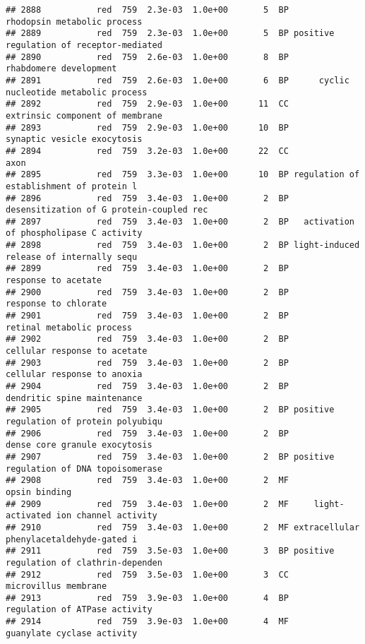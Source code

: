 \documentclass[]{article}
\begin{document}
\begin{verbatim}
## 2888           red  759  2.3e-03  1.0e+00       5  BP              rhodopsin metabolic process
## 2889           red  759  2.3e-03  1.0e+00       5  BP positive regulation of receptor-mediated
## 2890           red  759  2.6e-03  1.0e+00       8  BP                   rhabdomere development
## 2891           red  759  2.6e-03  1.0e+00       6  BP      cyclic nucleotide metabolic process
## 2892           red  759  2.9e-03  1.0e+00      11  CC          extrinsic component of membrane
## 2893           red  759  2.9e-03  1.0e+00      10  BP              synaptic vesicle exocytosis
## 2894           red  759  3.2e-03  1.0e+00      22  CC                                     axon
## 2895           red  759  3.3e-03  1.0e+00      10  BP regulation of establishment of protein l
## 2896           red  759  3.4e-03  1.0e+00       2  BP desensitization of G protein-coupled rec
## 2897           red  759  3.4e-03  1.0e+00       2  BP   activation of phospholipase C activity
## 2898           red  759  3.4e-03  1.0e+00       2  BP light-induced release of internally sequ
## 2899           red  759  3.4e-03  1.0e+00       2  BP                      response to acetate
## 2900           red  759  3.4e-03  1.0e+00       2  BP                     response to chlorate
## 2901           red  759  3.4e-03  1.0e+00       2  BP                retinal metabolic process
## 2902           red  759  3.4e-03  1.0e+00       2  BP             cellular response to acetate
## 2903           red  759  3.4e-03  1.0e+00       2  BP              cellular response to anoxia
## 2904           red  759  3.4e-03  1.0e+00       2  BP              dendritic spine maintenance
## 2905           red  759  3.4e-03  1.0e+00       2  BP positive regulation of protein polyubiqu
## 2906           red  759  3.4e-03  1.0e+00       2  BP            dense core granule exocytosis
## 2907           red  759  3.4e-03  1.0e+00       2  BP positive regulation of DNA topoisomerase
## 2908           red  759  3.4e-03  1.0e+00       2  MF                            opsin binding
## 2909           red  759  3.4e-03  1.0e+00       2  MF     light-activated ion channel activity
## 2910           red  759  3.4e-03  1.0e+00       2  MF extracellular phenylacetaldehyde-gated i
## 2911           red  759  3.5e-03  1.0e+00       3  BP positive regulation of clathrin-dependen
## 2912           red  759  3.5e-03  1.0e+00       3  CC                     microvillus membrane
## 2913           red  759  3.9e-03  1.0e+00       4  BP            regulation of ATPase activity
## 2914           red  759  3.9e-03  1.0e+00       4  MF               guanylate cyclase activity

\end{verbatim}
\end{document}
